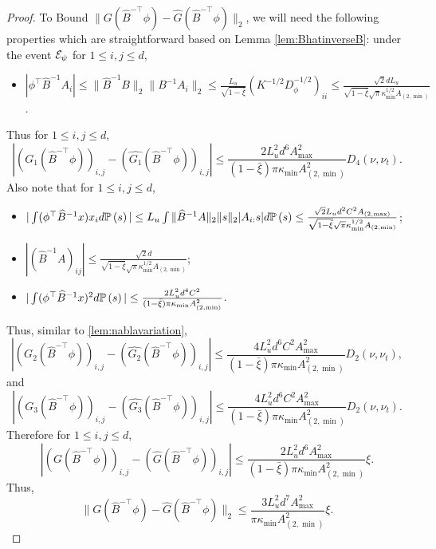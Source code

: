 \begin{proof}
To Bound $\|G(\widehat{B}^{-\top}\phi) - \widehat{G}(\widehat{B}^{-\top}\phi)\|_2$, we will need the following properties which are straightforward based on Lemma \ref{lem:BhatinverseB}: 
under the event $\mathcal{E}_{\psi}$ for $1\le i, j\le d$,
\begin{itemize}
\item $|\phi^{\top}\widehat{B}^{-1}A_i| \le \|\widehat{B}^{-1}B\|_2\|B^{-1}A_i\|_2\le
 \frac{L_u}{\sqrt{1-\bar{\xi}}} (K^{-1/2}D^{-1/2}_{\phi})_{ii} \le
 \frac{\sqrt{2}dL_u}{\sqrt{1-\bar{\xi}}\sqrt{\pi}\kappa_{\min}^{1/2}A_{(2,\min)}}$.
\end{itemize}
Thus for $1\le i, j\le d$,
\[
|(G_1(\widehat{B}^{-\top}\phi))_{i,j} - (\widehat{G_1}(\widehat{B}^{-\top}\phi))_{i,j}| \le
\frac{2L_u^2d^6A^2_{\max}}{(1-\bar{\xi})\pi\kappa_{\min}A^2_{(2,\min)}}D_4(\nu,\nu_t).
\]
Also note that for $1\le i, j\le d$,
\begin{itemize}
\item $|\int(\phi^{\top}\widehat{B}^{-1}x)x_i d\mathbb{P}\left(s\right)| 
\le L_u\int \|\widehat{B}^{-1}A\|_2\|s\|_2 |A_{i:}s| d\mathbb{P}\left(s\right)
\le \frac{\sqrt{2}L_ud^2C^2A_{(2,\max)}}{\sqrt{1-\bar{\xi}}\sqrt{\pi}\kappa_{\min}^{1/2}A_{(2,\min)}}$; 
\item $|(\widehat{B}^{-1}A)_{ij}| \le \frac{\sqrt{2}d}{\sqrt{1-\bar{\xi}}\sqrt{\pi}\kappa_{\min}^{1/2}A_{(2,\min)}}$;
\item $|\int(\phi^{\top}\widehat{B}^{-1}x)^2 d\mathbb{P}\left(s\right)|\le \frac{2L_u^2d^4C^2}{(1-\bar{\xi})\pi\kappa_{\min}A^2_{(2,\min)}}$.
\end{itemize}
Thus, similar to \ref{lem:nablavariation},
\[
|(G_2(\widehat{B}^{-\top}\phi))_{i,j} - (\widehat{G_2}(\widehat{B}^{-\top}\phi))_{i,j}| \le
\frac{4L_u^2d^6C^2A^2_{\max}}{(1-\bar{\xi})\pi\kappa_{\min}A^2_{(2,\min)}}D_2(\nu,\nu_t),
\]
and 
\[
|(G_3(\widehat{B}^{-\top}\phi))_{i,j} - (\widehat{G_3}(\widehat{B}^{-\top}\phi))_{i,j}| \le
\frac{4L_u^2d^6C^2A^2_{\max}}{(1-\bar{\xi})\pi\kappa_{\min}A^2_{(2,\min)}}D_2(\nu,\nu_t).
\]
Therefore for $1\le i,j\le d$,
\[
\left|\left(G(\widehat{B}^{-\top}\phi)\right)_{i,j} - \left(\widehat{G}(\widehat{B}^{-\top}\phi)\right)_{i,j}\right| 
\le
\frac{2L_u^2d^6A^2_{\max}}{(1-\bar{\xi})\pi\kappa_{\min}A^2_{(2,\min)}}\xi. 
\]
Thus, 
\begin{equation}
\label{eq:fBhatfhatBhat}
 \|G(\widehat{B}^{-\top}\phi) - \widehat{G}(\widehat{B}^{-\top}\phi)\|_2 \le 
\frac{3L_u^2d^7A^2_{\max}}{\pi\kappa_{\min}A^2_{(2,\min)}}\xi.
\end{equation}


\end{proof}
